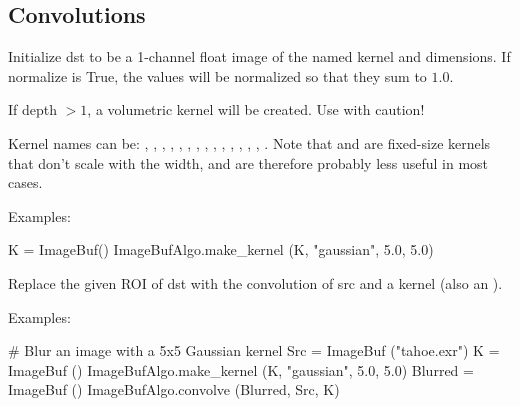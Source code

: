 \subsection{Convolutions}
\label{sec:iba:py:convolutions}

 
Initialize {\cf dst} to be a 1-channel {\cf float} image of the named kernel
and dimensions.  If {\cf normalize} is {\cf True}, the values will be
normalized so that they sum to $1.0$.

If {\cf depth} $> 1$, a volumetric kernel will be created.  Use with
caution!

Kernel names can be: , , ,
, , , ,
, , , , ,
, , . Note that
 and  are fixed-size kernels that don't
scale with the width, and are therefore probably less useful in most
cases.

\smallskip
\noindent Examples:
\begin{code}
    K = ImageBuf()
    ImageBufAlgo.make_kernel (K, "gaussian", 5.0, 5.0)
\end{code}
\apiend


 
Replace the given ROI of {\cf dst} with the convolution of {\cf src} and
a kernel (also an \ImageBuf).

\smallskip
\noindent Examples:
\begin{code}
    # Blur an image with a 5x5 Gaussian kernel
    Src = ImageBuf ("tahoe.exr")
    K = ImageBuf ()
    ImageBufAlgo.make_kernel (K, "gaussian", 5.0, 5.0)
    Blurred = ImageBuf ()
    ImageBufAlgo.convolve (Blurred, Src, K)
\end{code}
\apiend


 
 

